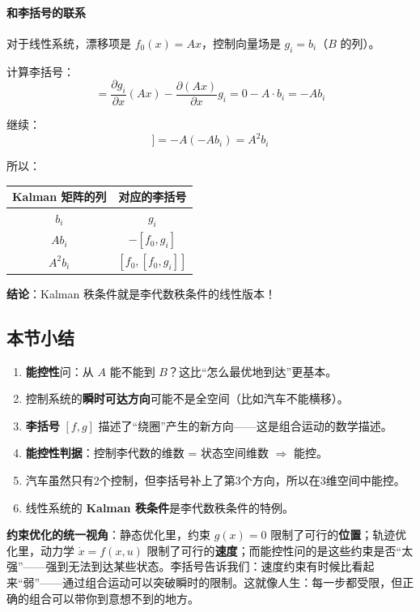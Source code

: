 \paragraph{和李括号的联系}

对于线性系统，漂移项是 $f_0(x) = Ax$，控制向量场是 $g_i = b_i$（$B$ 的列）。

计算李括号：
\begin{equation}
[f_0, g_i] = \frac{\partial g_i}{\partial x} (Ax) - \frac{\partial (Ax)}{\partial x} g_i = 0 - A \cdot b_i = -Ab_i
\end{equation}

继续：
\begin{equation}
[f_0, [f_0, g_i]] = -A(-Ab_i) = A^2 b_i
\end{equation}

所以：

\begin{center}
\renewcommand{\arraystretch}{1.3}
\begin{tabular}{c|c}
\toprule
\textbf{Kalman 矩阵的列} & \textbf{对应的李括号} \\
\midrule
$b_i$ & $g_i$ \\
$Ab_i$ & $-[f_0, g_i]$ \\
$A^2 b_i$ & $[f_0, [f_0, g_i]]$ \\
\bottomrule
\end{tabular}
\end{center}

\textbf{结论}：Kalman 秩条件就是李代数秩条件的线性版本！

\subsection*{本节小结}

\begin{enumerate}
    \item \textbf{能控性}问：从 $A$ 能不能到 $B$？这比“怎么最优地到达”更基本。
    
    \item 控制系统的\textbf{瞬时可达方向}可能不是全空间（比如汽车不能横移）。
    
    \item \textbf{李括号} $[f, g]$ 描述了“绕圈”产生的新方向——这是组合运动的数学描述。
    
    \item \textbf{能控性判据}：控制李代数的维数 = 状态空间维数 $\Rightarrow$ 能控。
    
    \item 汽车虽然只有2个控制，但李括号补上了第3个方向，所以在3维空间中能控。
    
    \item 线性系统的 \textbf{Kalman 秩条件}是李代数秩条件的特例。
\end{enumerate}

\begin{remark}
\textbf{约束优化的统一视角}：静态优化里，约束 $g(x) = 0$ 限制了可行的\textbf{位置}；轨迹优化里，动力学 $\dot{x} = f(x, u)$ 限制了可行的\textbf{速度}；而能控性问的是这些约束是否“太强”——强到无法到达某些状态。李括号告诉我们：速度约束有时候比看起来“弱”——通过组合运动可以突破瞬时的限制。这就像人生：每一步都受限，但正确的组合可以带你到意想不到的地方。
\end{remark}
